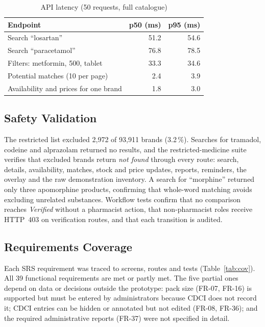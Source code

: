 \documentclass[11pt,a4paper]{article}
\begin{document}
\begin{table}[H]
\caption{API latency (50 requests, full catalogue)}
\label{tab:perf}
\centering
\small
\begin{tabular}{@{}lrr@{}}
\toprule
Endpoint & p50 (ms) & p95 (ms) \\
\midrule
Search ``losartan''                         & 51.2 & 54.6 \\
Search ``paracetamol''                      & 76.8 & 78.5 \\
Filters: metformin, 500, tablet             & 33.3 & 34.6 \\
Potential matches (10 per page)             & 2.4  & 3.9 \\
Availability and prices for one brand       & 1.8  & 3.0 \\
\bottomrule
\end{tabular}
\end{table}

\subsection{Safety Validation}
The restricted list excluded 2{,}972 of 93{,}911 brands (3.2\,\%). Searches for tramadol, codeine and alprazolam returned no results, and the restricted-medicine suite verifies that excluded brands return \emph{not found} through every route: search, details, availability, matches, stock and price updates, reports, reminders, the overlay and the raw demonstration inventory. A search for ``morphine'' returned only three apomorphine products, confirming that whole-word matching avoids excluding unrelated substances. Workflow tests confirm that no comparison reaches \emph{Verified} without a pharmacist action, that non-pharmacist roles receive HTTP~403 on verification routes, and that each transition is audited.

\subsection{Requirements Coverage}
Each SRS requirement was traced to screens, routes and tests (Table~\ref{tab:cov}). All 39 functional requirements are met or partly met. The five partial ones depend on data or decisions outside the prototype: pack size (FR-07, FR-16) is supported but must be entered by administrators because CDCI does not record it; CDCI entries can be hidden or annotated but not edited (FR-08, FR-36); and the required administrative reports (FR-37) were not specified in detail.
\end{document}
